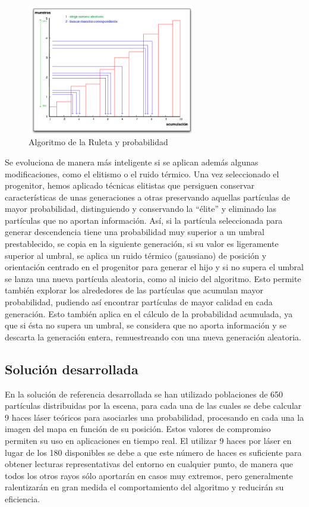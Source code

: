 \begin{figure}[H]
\begin{center}
	\includegraphics[width=0.65\textwidth]{figures/pacruleta.png}
	\caption{Algoritmo de la Ruleta y probabilidad}
	\label{fig.pacruleta}
	\end{center}
\end{figure}

Se evoluciona de manera más inteligente si se aplican además algunas modificaciones, como el elitismo o el ruido térmico. Una vez seleccionado el progenitor, hemos aplicado técnicas elitistas que persiguen conservar características de unas generaciones a otras preservando aquellas partículas de mayor probabilidad, distinguiendo y conservando la “élite” y eliminado las partículas que no aportan información. Así, si la partícula seleccionada para generar descendencia tiene una probabilidad muy superior a un umbral prestablecido, se copia en la siguiente generación, si su valor es ligeramente superior al umbral, se aplica un ruido térmico (gaussiano) de posición y orientación centrado en el progenitor para generar el hijo y si no supera el umbral se lanza una nueva partícula aleatoria, como al inicio del algoritmo. Esto permite también explorar los alrededores de las partículas que acumulan mayor probabilidad, pudiendo así encontrar partículas de mayor calidad en cada generación. Esto también aplica en el cálculo de la probabilidad acumulada, ya que si ésta no supera un umbral, se considera que no aporta información y se descarta la generación entera, remuestreando con una nueva generación aleatoria.

\subsection{Solución desarrollada}
En la solución de referencia desarrollada se han utilizado poblaciones de 650 partículas distribuidas por la escena, para cada una de las cuales se debe calcular 9 haces láser teóricos para asociarles una probabilidad, procesando en cada una la imagen del mapa en función de su posición. Estos valores de compromiso permiten su uso en aplicaciones en tiempo real. El utilizar 9 haces por láser en lugar de los 180 disponibles se debe a que este número de haces es suficiente para obtener lecturas representativas del entorno en cualquier punto, de manera que todos los otros rayos sólo aportarán en casos muy extremos, pero generalmente ralentizarán en gran medida el comportamiento del algoritmo y reducirán su eficiencia. 

